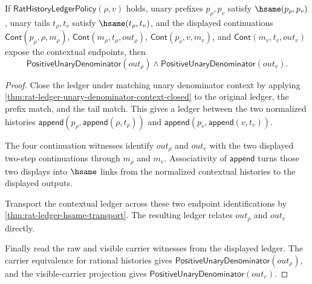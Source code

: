 \begin{theorem}
\label{thm:rat-history-ledger-cont-unary-context-positive-denominators}
If $\mathsf{RatHistoryLedgerPolicy}(\rho,v)$ holds, unary prefixes
$p_\rho,p_v$ satisfy $\hsame(p_\rho,p_v)$, unary tails $t_\rho,t_v$ satisfy
$\hsame(t_\rho,t_v)$, and the displayed continuations
$\mathsf{Cont}(p_\rho,\rho,m_\rho)$,
$\mathsf{Cont}(m_\rho,t_\rho,out_\rho)$,
$\mathsf{Cont}(p_v,v,m_v)$, and
$\mathsf{Cont}(m_v,t_v,out_v)$ expose the contextual endpoints, then
$$
\mathsf{PositiveUnaryDenominator}(out_\rho)\land
\mathsf{PositiveUnaryDenominator}(out_v).
$$
\end{theorem}
\begin{proof}
Close the ledger under matching unary denominator context by applying
\autoref{thm:rat-ledger-unary-denominator-context-closed} to the original
ledger, the prefix match, and the tail match. This gives a ledger between the
two normalized histories
$\mathsf{append}(p_\rho,\mathsf{append}(\rho,t_\rho))$ and
$\mathsf{append}(p_v,\mathsf{append}(v,t_v))$.

The four continuation witnesses identify $out_\rho$ and $out_v$ with the
two displayed two-step continuations through $m_\rho$ and $m_v$. Associativity
of $\mathsf{append}$ turns those two displays into $\hsame$ links from the
normalized contextual histories to the displayed outputs.

Transport the contextual ledger across these two endpoint identifications by
\autoref{thm:rat-ledger-hsame-transport}. The resulting ledger relates
$out_\rho$ and $out_v$ directly.

Finally read the raw and visible carrier witnesses from the displayed ledger.
The carrier equivalence for rational histories gives
$\mathsf{PositiveUnaryDenominator}(out_\rho)$, and the visible-carrier
projection gives $\mathsf{PositiveUnaryDenominator}(out_v)$.
\end{proof}

